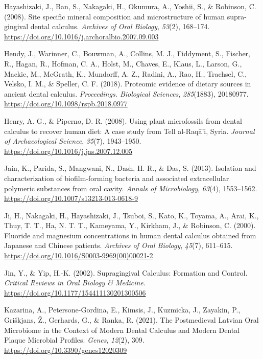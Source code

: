 \documentclass[
]{article}
\newlength{\cslhangindent}
\newlength{\cslentryspacingunit} %
\newenvironment{CSLReferences}[2] %
 {%
  \setlength{\parindent}{0pt}
  \ifodd #1
  \let\oldpar\par
  \def\par{\hangindent=\cslhangindent\oldpar}
  \fi
  \setlength{\parskip}{#2\cslentryspacingunit}
 }%
 {}
\begin{document}
\begin{CSLReferences}{1}{0}
\leavevmode{}%
Hayashizaki, J., Ban, S., Nakagaki, H., Okumura, A., Yoshii, S., \&
Robinson, C. (2008). Site specific mineral composition and
microstructure of human supra-gingival dental calculus. \emph{Archives
of Oral Biology}, \emph{53}(2), 168--174.
\url{https://doi.org/10.1016/j.archoralbio.2007.09.003}

\leavevmode{}%
Hendy, J., Warinner, C., Bouwman, A., Collins, M. J., Fiddyment, S.,
Fischer, R., Hagan, R., Hofman, C. A., Holst, M., Chaves, E., Klaus, L.,
Larson, G., Mackie, M., McGrath, K., Mundorff, A. Z., Radini, A., Rao,
H., Trachsel, C., Velsko, I. M., \& Speller, C. F. (2018). Proteomic
evidence of dietary sources in ancient dental calculus.
\emph{Proceedings. Biological Sciences}, \emph{285}(1883), 20180977.
\url{https://doi.org/10.1098/rspb.2018.0977}

\leavevmode{}%
Henry, A. G., \& Piperno, D. R. (2008). Using plant microfossils from
dental calculus to recover human diet: A case study from {Tell}
al-{Raqā}'i, {Syria}. \emph{Journal of Archaeological Science},
\emph{35}(7), 1943--1950.
\url{https://doi.org/10.1016/j.jas.2007.12.005}

\leavevmode{}%
Jain, K., Parida, S., Mangwani, N., Dash, H. R., \& Das, S. (2013).
Isolation and characterization of biofilm-forming bacteria and
associated extracellular polymeric substances from oral cavity.
\emph{Annals of Microbiology}, \emph{63}(4), 1553--1562.
\url{https://doi.org/10.1007/s13213-013-0618-9}

\leavevmode{}%
Ji, H., Nakagaki, H., Hayashizaki, J., Tsuboi, S., Kato, K., Toyama, A.,
Arai, K., Thuy, T. T., Ha, N. T. T., Kameyama, Y., Kirkham, J., \&
Robinson, C. (2000). Fluoride and magnesium concentrations in human
dental calculus obtained from {Japanese} and {Chinese} patients.
\emph{Archives of Oral Biology}, \emph{45}(7), 611--615.
\url{https://doi.org/10.1016/S0003-9969(00)00021-2}

\leavevmode{}%
Jin, Y., \& Yip, H.-K. (2002). Supragingival {Calculus}: {Formation} and
{Control}. \emph{Critical Reviews in Oral Biology \& Medicine}.
\url{https://doi.org/10.1177/154411130201300506}

\leavevmode{}%
Kazarina, A., Petersone-Gordina, E., Kimsis, J., Kuzmicka, J., Zayakin,
P., Griškjans, Ž., Gerhards, G., \& Ranka, R. (2021). The {Postmedieval
Latvian Oral Microbiome} in the {Context} of {Modern Dental Calculus}
and {Modern Dental Plaque Microbial Profiles}. \emph{Genes},
\emph{12}(2), 309. \url{https://doi.org/10.3390/genes12020309}


\end{CSLReferences}
\end{document}
